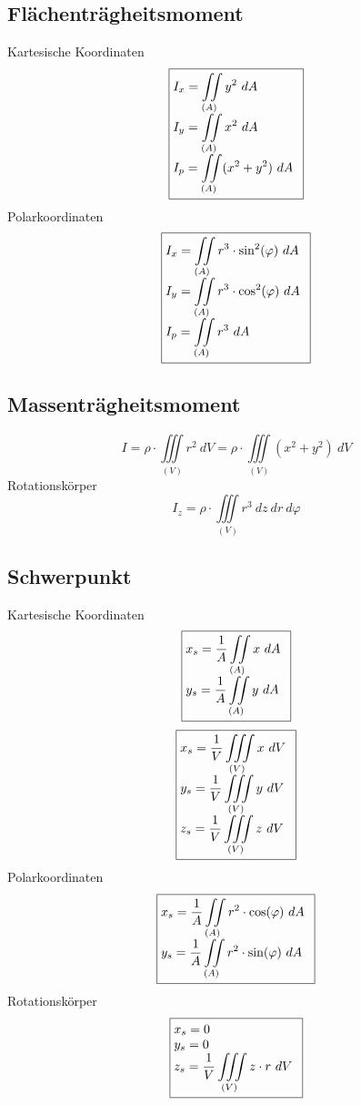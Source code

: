 \subsection{Flächenträgheitsmoment}
Kartesische Koordinaten
\[ \boxed{\begin{array}{@{}l}
\displaystyle I_x = \iint\limits_{(A)} y^2 ~ dA \\
\displaystyle I_y = \iint\limits_{(A)} x^2 ~ dA \\
\displaystyle I_p = \iint\limits_{(A)} (x^2 + y^2) ~ dA \\
\end{array}} \]
Polarkoordinaten
\[ \boxed{\begin{array}{@{}l}
\displaystyle I_x = \iint\limits_{(A)} r^3 \cdot \sin^2(\varphi) ~ dA \\
\displaystyle I_y = \iint\limits_{(A)} r^3 \cdot \cos^2(\varphi) ~ dA \\
\displaystyle I_p = \iint\limits_{(A)} r^3 ~ dA \\
\end{array}} \]

\subsection{Massenträgheitsmoment}
\[ \boxed{I = \rho \cdot \iiint\limits_{(V)} r^2 ~ dV 
= \rho \cdot \iiint\limits_{(V)} (x^2 + y^2) ~ dV} \]
Rotationskörper
\[ \boxed{I_z = \rho \cdot \iiint\limits_{(V)} r^3 ~ dz ~ dr ~ d\varphi} \]

\subsection{Schwerpunkt}
Kartesische Koordinaten
\[ \boxed{\begin{array}{@{}l}
\displaystyle x_s = \frac{1}{A} \iint\limits_{(A)} x ~ dA \\
\displaystyle y_s = \frac{1}{A} \iint\limits_{(A)} y ~ dA \\
\end{array}} \]
\[ \boxed{\begin{array}{@{}l}
\displaystyle x_s = \frac{1}{V} \iiint\limits_{(V)} x ~ dV \\
\displaystyle y_s = \frac{1}{V} \iiint\limits_{(V)} y ~ dV \\
\displaystyle z_s = \frac{1}{V} \iiint\limits_{(V)} z ~ dV \\
\end{array}} \]
Polarkoordinaten
\[ \boxed{\begin{array}{@{}l}
\displaystyle x_s 
= \frac{1}{A} \iint\limits_{(A)} r^2 \cdot \cos(\varphi) ~ dA \\
\displaystyle y_s 
= \frac{1}{A} \iint\limits_{(A)} r^2 \cdot \sin(\varphi) ~ dA \\
\end{array}} \]
Rotationskörper
\[ \boxed{\begin{array}{@{}l}
\displaystyle x_s = 0 \\
\displaystyle y_s = 0 \\
\displaystyle z_s = \frac{1}{V} \iiint\limits_{(V)} z \cdot r ~ dV \\
\end{array}} \]

